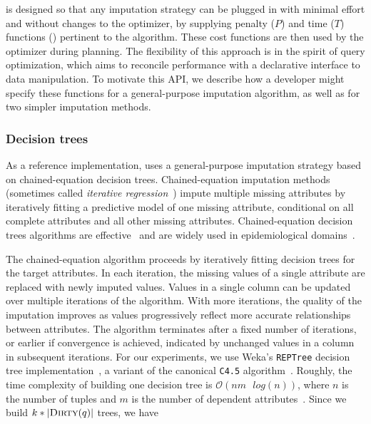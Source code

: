 {\ProjectName{} is designed so that any imputation strategy can be plugged in with minimal effort and without changes to the optimizer, by supplying penalty ($P$) and time ($T$) functions () pertinent to the algorithm.
These cost functions are then used by the optimizer during planning.
The flexibility of this approach is in the spirit of query optimization, which aims to reconcile performance with a declarative interface to data manipulation.
To motivate this API, we describe how a developer might specify these functions for a general-purpose imputation algorithm, as well as for two simpler imputation methods.

\subsubsection{Decision trees}\label{subsubsec:decision-trees}

As a reference implementation,
\ProjectName{} uses a general-purpose imputation strategy based on
chained-equation decision trees.  Chained-equation imputation
methods~\cite{vanbuuren2011mice} (sometimes called \textit{iterative
regression}~\cite{gelman2006data}) impute multiple missing attributes by
iteratively fitting a predictive model of one missing attribute, conditional on
all complete attributes and all other missing attributes. Chained-equation
decision trees algorithms are effective~\cite{akande2015empirical}
and are widely used in epidemiological domains~\cite{burgette2010multiple}.


The chained-equation algorithm proceeds by
iteratively fitting decision trees for the target attributes. 
In each iteration, the missing values of a single attribute are replaced with newly imputed values.  Values in a single column can be updated over multiple
iterations of the algorithm. With more iterations, the quality of the
imputation improves as values progressively reflect more accurate relationships
between attributes. The algorithm terminates after a fixed number of
iterations, or earlier if convergence is achieved, indicated by unchanged values in a 
column in subsequent iterations. For our experiments, we use Weka's \texttt{REPTree}
decision tree implementation~\cite{witten2016data}, a variant of the canonical \texttt{C4.5}
algorithm~\cite{quinlan1993}. Roughly, the time complexity of building one
decision tree is $\mathcal{O}(nm \text{ } log(n))$, where $n$ is the number of tuples
and $m$ is the number of dependent attributes~\cite{witten2016data}. Since we build
$k * |\textsc{Dirty}(q)|$ trees, we have

}
